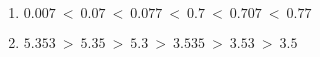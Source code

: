     \ \\ [-5mm]
    \begin{enumerate}
        \item {\red $\num{0.007} ~<~ \num{0.07} ~<~ \num{0.077} ~<~ \num{0.7   } ~<~ \num{0.707} ~<~ \num{0.77}$}
        \item {\red $\num{5.353} ~>~ \num{5.35} ~>~ \num{5.3}   ~>~ \num{3.535 } ~>~ \num{3.53}  ~>~ \num{3.5}$ }
    \end{enumerate}
